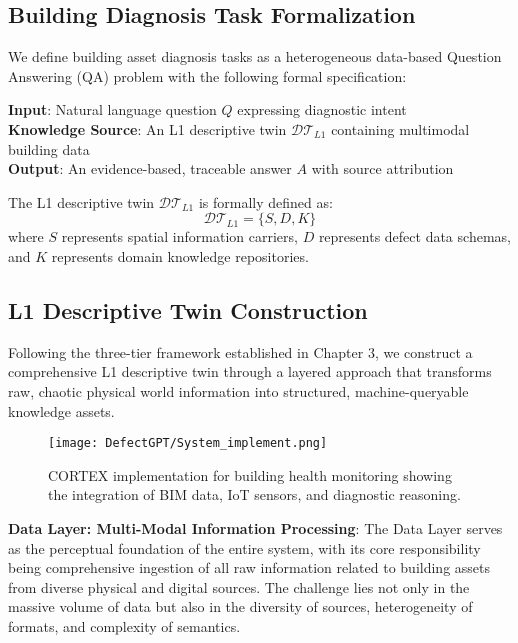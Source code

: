 \subsection{Building Diagnosis Task Formalization}

We define building asset diagnosis tasks as a heterogeneous data-based Question Answering (QA) problem with the following formal specification:

\textbf{Input}: Natural language question $Q$ expressing diagnostic intent\\
\textbf{Knowledge Source}: An L1 descriptive twin $\mathcal{DT}_{L1}$ containing multimodal building data\\
\textbf{Output}: An evidence-based, traceable answer $A$ with source attribution

The L1 descriptive twin $\mathcal{DT}_{L1}$ is formally defined as:
\begin{equation}
\mathcal{DT}_{L1} = \{S, D, K\}
\end{equation}
where $S$ represents spatial information carriers, $D$ represents defect data schemas, and $K$ represents domain knowledge repositories.

\subsection{L1 Descriptive Twin Construction}

Following the three-tier framework established in Chapter 3, we construct a comprehensive L1 descriptive twin through a layered approach that transforms raw, chaotic physical world information into structured, machine-queryable knowledge assets.

\begin{figure}[htbp]
\centering
\texttt{[image: DefectGPT/System\_implement.png]}
\caption{CORTEX implementation for building health monitoring showing the integration of BIM data, IoT sensors, and diagnostic reasoning.}
\label{fig:system_implementation}
\end{figure}

\textbf{Data Layer: Multi-Modal Information Processing}: The Data Layer serves as the perceptual foundation of the entire system, with its core responsibility being comprehensive ingestion of all raw information related to building assets from diverse physical and digital sources. The challenge lies not only in the massive volume of data but also in the diversity of sources, heterogeneity of formats, and complexity of semantics.

